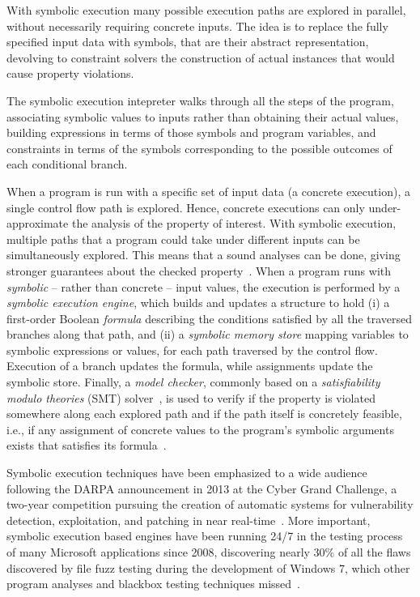 With symbolic execution many possible execution paths are explored in parallel, without necessarily requiring concrete inputs. The idea is to replace the fully specified input data with symbols, that are their abstract representation, devolving to constraint solvers the construction of actual instances that would cause property violations. 

The symbolic execution intepreter walks through all the steps of the program, associating symbolic values to inputs rather than obtaining their actual values, building  expressions in terms of those symbols and program variables, and constraints in terms of the symbols corresponding to the possible outcomes of each conditional branch. 

When a program is run with a specific set of input data (a concrete execution), a single control flow path is explored. Hence, concrete executions can only under-approximate the analysis of the property of interest. With symbolic execution, multiple paths that a program could take under different inputs can be simultaneously explored. This means that a sound analyses can be done, giving stronger guarantees about the checked property~\cite{Baldoni:2018:SSE:3212709.3182657}. When a program runs with {\em symbolic} -- rather than concrete -- input values, the execution is performed by a {\em symbolic execution engine}, which builds and updates a structure to hold (i) a first-order Boolean {\em formula} describing the conditions satisfied by all the traversed branches along that path, and (ii) a {\em symbolic memory store} mapping variables to symbolic expressions or values, for each path traversed by the control flow. Execution of a branch updates the formula, while assignments update the symbolic store. Finally, a {\em model checker}, commonly based on a {\em satisfiability modulo theories} (SMT) solver~\cite{BKM14}, is  used to verify if the property is violated somewhere along each explored path and if the path itself is concretely feasible, i.e., if any assignment of concrete values to the program's symbolic arguments exists that satisfies its formula~\cite{Baldoni:2018:SSE:3212709.3182657}.

Symbolic execution techniques have been emphasized to a wide audience following the DARPA announcement in 2013 at the Cyber Grand Challenge, a two-year competition pursuing the creation of automatic systems for vulnerability detection, exploitation, and patching in near real-time~\cite{ANGR-SSP16}.
More important, symbolic execution based engines have been running 24/7 in the testing process of many Microsoft applications since 2008, discovering nearly 30\% of all the flaws discovered by file fuzz testing during the development of Windows 7, which other program analyses and blackbox testing techniques missed~\cite{SAGE-QUEUE12}.


